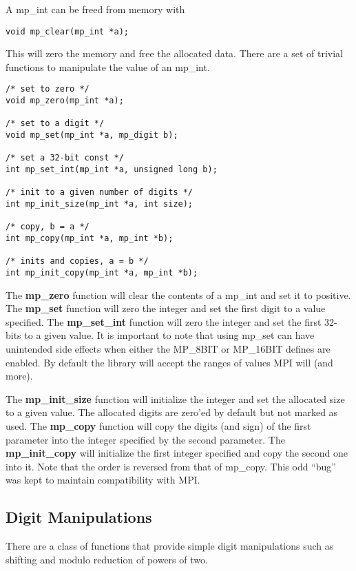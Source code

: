 \documentclass[]{article}
\begin{document}
A mp\_int can be freed from memory with

\begin{verbatim}
void mp_clear(mp_int *a);
\end{verbatim}

This will zero the memory and free the allocated data.  There are a set of trivial functions to manipulate the 
value of an mp\_int.  

\begin{verbatim}
/* set to zero */
void mp_zero(mp_int *a);

/* set to a digit */
void mp_set(mp_int *a, mp_digit b);

/* set a 32-bit const */
int mp_set_int(mp_int *a, unsigned long b);

/* init to a given number of digits */
int mp_init_size(mp_int *a, int size);

/* copy, b = a */
int mp_copy(mp_int *a, mp_int *b);

/* inits and copies, a = b */
int mp_init_copy(mp_int *a, mp_int *b);
\end{verbatim}

The \textbf{mp\_zero} function will clear the contents of a mp\_int and set it to positive.  The \textbf{mp\_set} function 
will zero the integer and set the first digit to a value specified.  The \textbf{mp\_set\_int} function will zero the 
integer and set the first 32-bits to a given value.  It is important to note that using mp\_set can have unintended 
side effects when either the  MP\_8BIT or MP\_16BIT defines are enabled.  By default the library will accept the 
ranges of values MPI will (and more).

The \textbf{mp\_init\_size} function will initialize the integer and set the allocated size to a given value.  The 
allocated digits are zero'ed by default but not marked as used.  The \textbf{mp\_copy} function will copy the digits
(and sign) of the first parameter into the integer specified by the second parameter.  The \textbf{mp\_init\_copy} will
initialize the first integer specified and copy the second one into it.  Note that the order is reversed from that of
mp\_copy.  This odd ``bug'' was kept to maintain compatibility with MPI.

\subsection{Digit Manipulations}

There are a class of functions that provide simple digit manipulations such as shifting and modulo reduction of powers
of two.  
\end{document}
